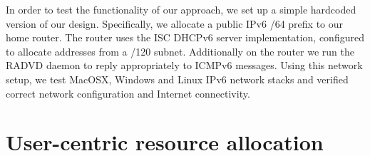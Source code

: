 


In order to test the functionality of our approach, we set up a simple hardcoded
version of our design. Specifically, we allocate a public IPv6 /64 prefix to our
home router. The router uses the ISC DHCPv6 server implementation, configured to
allocate addresses from a /120 subnet.  Additionally on the router we run the
RADVD daemon to reply appropriately to ICMPv6 messages.  Using this network
setup, we test MacOSX, Windows and Linux IPv6 network stacks and verified
correct network configuration and Internet connectivity. 


\section{User-centric resource allocation} \label{s:qos}

